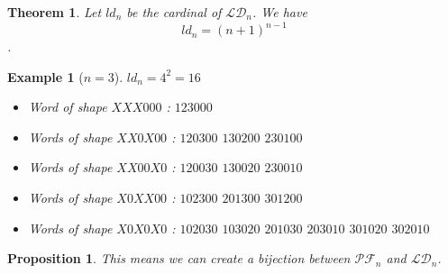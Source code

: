 \documentclass[12pt]{report}
\newtheorem{theorem}{Theorem}
\newtheorem*{prop}{Proposition}
\newtheorem*{example}{Example}
\begin{document}
\begin{theorem}
    Let $ld_n$ be the cardinal of $\mathcal{LD}_n$.
    We have $$ld_n = (n + 1)^{n - 1}$$.
\end{theorem}

\begin{example}[$n = 3$]
    $ld_n = 4^2 = 16$
    \begin{itemize}
        \item Word of shape $XXX000$ :
            \subitem $123000$
        \item Words of shape $XX0X00$ :
            \subitem $120300$
            \hspace{2cm} $130200$
            \hspace{2cm} $230100$
        \item Words of shape $XX00X0$ :
            \subitem $120030$
            \hspace{2cm} $130020$
            \hspace{2cm} $230010$
        \item Words of shape $X0XX00$ :
            \subitem $102300$
            \hspace{2cm} $201300$
            \hspace{2cm} $301200$
        \item Words of shape $X0X0X0$ :
            \subitem $102030$
            \hspace{2cm} $103020$
            \hspace{2cm} $201030$
            \subitem $203010$
            \hspace{2cm} $301020$
            \hspace{2cm} $302010$
    \end{itemize}
    
\end{example}

\begin{prop}
    This means we can create a \emph{bijection} between
    $\mathcal{PF}_n$ and $\mathcal{LD}_n$.
\end{prop}
\end{document}
